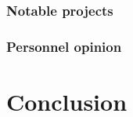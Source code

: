 \documentclass[a4paper,11pt]{report}
\begin{document}
  \subsubsection{Notable projects}
  
  \subsubsection{Personnel opinion}
  
  
  
  
  \section{Conclusion}

  
%
%
\end{document}
